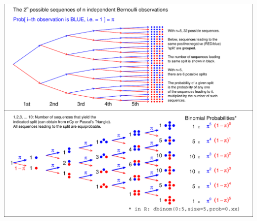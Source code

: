 \documentclass{beamer}\usepackage[]{graphicx}\usepackage[]{color}
\newenvironment{knitrout}{}{} %
\begin{document}

\begin{frame}[fragile]{}
\begin{knitrout}\scriptsize
{}\color{fgcolor}

{\centering \includegraphics[width=1\linewidth]{figure/unnamed-chunk-3-1} 

}



\end{knitrout}
\end{frame}
\end{document}
